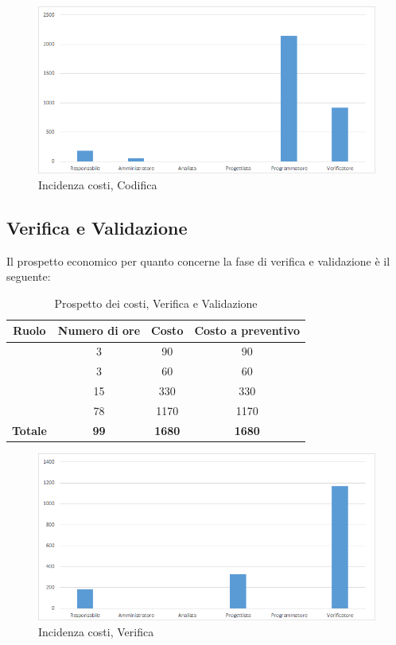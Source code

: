 \begin{figure}[H]
	\centering
	\includegraphics[scale=0.6]{img/8-4.png}
	\caption{Incidenza costi, Codifica}
\end{figure}

\subsection{Verifica e Validazione}
Il prospetto economico per quanto concerne la fase di verifica e validazione è il seguente:


\begin{table}[H]
	\begin{center}
		\begin{tabular}{|c|c|c|c|}
			\hline
			\textbf{Ruolo}	& \textbf{Numero di ore} & \textbf{Costo} & \textbf{Costo a preventivo}\\
			\hline
			\Res	&	3  &	90  &	90	\\
			\hline
			\Amm	&	3  &	60  &	60	\\
			\hline
			\Prog	&	15  &	330  &	330	\\
			\hline
			\Ver	&	78  &	1170  &	1170	\\
			\hline
			\textbf{Totale}  &	\textbf{99}  &	\textbf{1680}  &	\textbf{1680}	\\
			\hline
		\end{tabular}
	\end{center}
	\caption{Prospetto dei costi, Verifica e Validazione}
\end{table}

\begin{figure}[H]
	\centering
	\includegraphics[scale=0.6]{img/8-5.png}
	\caption{Incidenza costi, Verifica}
\end{figure}

